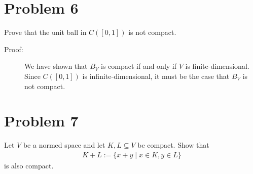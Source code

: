 \documentclass[10pt]{extarticle}
\begin{document}
  \section{Problem 6}%
  Prove that the unit ball in $C([0,1])$ is not compact.
  \begin{description}
    \item[Proof:] We have shown that $B_V$ is compact if and only if $V$ is finite-dimensional. Since $C([0,1])$ is infinite-dimensional, it must be the case that $B_V$ is not compact.
  \end{description}
  \section{Problem 7}%
  Let $V$ be a normed space and let $K,L\subseteq V$ be compact. Show that
  \begin{align*}
    K+L := \{x+y\mid x\in K,y\in L\}
  \end{align*}
  is also compact.
\end{document}
